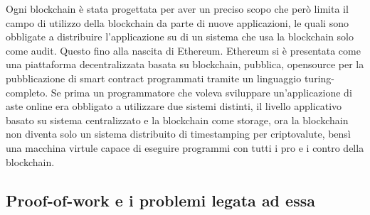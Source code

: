 	Ogni blockchain è stata progettata per aver un preciso scopo che però limita il campo di utilizzo della blockchain da parte di nuove applicazioni, le quali sono obbligate a distribuire l'applicazione su di un sistema che usa la blockchain solo come audit.
	Questo fino alla nascita di Ethereum. 
	Ethereum si è presentata come una piattaforma decentralizzata basata su blockchain, pubblica, opensource per la pubblicazione di smart contract programmati tramite un linguaggio turing-completo. Se prima un programmatore che voleva sviluppare un'applicazione di aste online era obbligato a utilizzare due sistemi distinti, il livello applicativo basato su sistema centralizzato e la blockchain come storage, ora la blockchain non diventa solo un sistema distribuito di timestamping per criptovalute, bensì una macchina virtule capace di eseguire programmi con tutti i pro e i contro della blockchain\cite{wood2014ethereum}.
	

	\subsection{Proof-of-work e i problemi legata ad essa}

